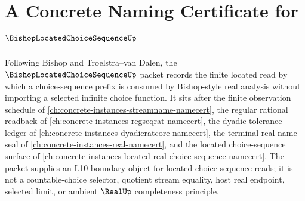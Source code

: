 \chapter{A Concrete Naming Certificate for $\BishopLocatedChoiceSequenceUp$}
\label{ch:concrete-instances-bishop-located-choice-sequence-namecert}

Following Bishop and Troelstra--van Dalen, the $\BishopLocatedChoiceSequenceUp$ packet records the finite located read by which a choice-sequence prefix is consumed by Bishop-style real analysis without importing a selected infinite choice function. It sits after the finite observation schedule of \autoref{ch:concrete-instances-streamname-namecert}, the regular rational readback of \autoref{ch:concrete-instances-regseqrat-namecert}, the dyadic tolerance ledger of \autoref{ch:concrete-instances-dyadicratcore-namecert}, the terminal real-name seal of \autoref{ch:concrete-instances-real-namecert}, and the located choice-sequence surface of \autoref{ch:concrete-instances-located-real-choice-sequence-namecert}. The packet supplies an L10 boundary object for located choice-sequence reads; it is not a countable-choice selector, quotient stream equality, host real endpoint, selected limit, or ambient $\RealUp$ completeness principle.

